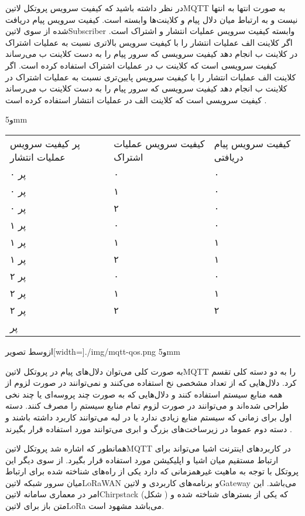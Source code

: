 در نظر داشته باشید که کیفیت سرویس پروتکل ‌لاتین{MQTT} به صورت انتها به انتها نیست و به ارتباط میان دلال پیام و کلاینت‌ها وابسته است.
کیفیت سرویس پیام دریافت شده از سوی ‌لاتین{Subscriber} وابسته کیفیت سرویس عملیات انتشار و اشتراک است. اگر کلاینت الف عملیات انتشار را با کیفیت سرویس بالاتری
نسبت به عملیات اشتراک در کلاینت ب انجام دهد کیفیت سرویسی که سرور پیام را به دست کلاینت ب می‌رساند کیفیت سرویسی است که کلاینت ب در عملیات اشتراک استفاده کرده است.
اگر کلاینت الف عملیات انتشار را با کیفیت سرویس پایین‌تری نسبت به عملیات اشتراک در کلاینت ب انجام دهد کیفیت سرویسی که سرور پیام را به دست کلاینت ب می‌رساند کیفیت سرویسی است که
کلاینت الف در عملیات انتشار استفاده کرده است
.

‌و{5mm}
\begin{tabularx}{\textwidth}{|X|X|X|}
‌پر
کیفیت سرویس عملیات انتشار & کیفیت سرویس عملیات اشتراک & کیفیت سرویس پیام دریافتی \\
‌پر
۰ & ۰ & ۰ \\
‌پر
۰ & ۱ & ۰ \\
‌پر
۰ & ۲ & ۰ \\
‌پر
۱ & ۰ & ۰ \\
‌پر
۱ & ۱ & ۱ \\
‌پر
۱ & ۲ & ۱ \\
‌پر
۲ & ۰ & ۰ \\
‌پر
۲ & ۱ & ۱ \\
‌پر
۲ & ۲ & ۲ \\
‌پر
\end{tabularx}

‌ازوسط
‌تصویر[width=\textwidth]{./img/mqtt-qos.png}
‌و{5mm}

به صورت کلی می‌توان دلال‌های پیام در پروتکل ‌لاتین{MQTT} را به دو دسته کلی تقسم کرد. دلال‌هایی که از تعداد مشخصی نخ استفاده می‌کنند و نمی‌توانند در صورت لزوم از همه منابع سیستم استفاده کنند و دلال‌هایی که به صورت چند پروسه‌ای یا چند نخی طراحی شده‌اند
و می‌توانند در صورت لزوم تمام منابع سیستم را مصرف کنند. دسته اول برای زمانی که سیستم منابع زیادی ندارد یا در لبه می‌توانند کاربرد داشته باشند و دسته دوم عموما در زیرساخت‌های بزرگ و ابری می‌توانند مورد استفاده قرار بگیرند
.

همانطور که اشاره شد پروتکل ‌لاتین{MQTT} در کاربردهای اینترنت اشیا می‌تواند برای ارتباط مستقیم میان اشیا و اپلیکیشن مورد استفاده قرار بگیرد. از سوی دیگر این پروتکل با توجه به ماهیت غیرهمزمانی که دارد یکی از راه‌های شناخته شده برای ارتباط میان سرور شبکه ‌لاتین{LoRaWAN}
و برنامه‌های کاربردی و ‌لاتین{Gateway} می‌باشد. این امر در معماری سامانه ‌لاتین{Chirpstack} (شکل ) که یکی از بسترهای شناخته شده و متن باز برای ‌لاتین{LoRa} می‌باشد مشهود است.


